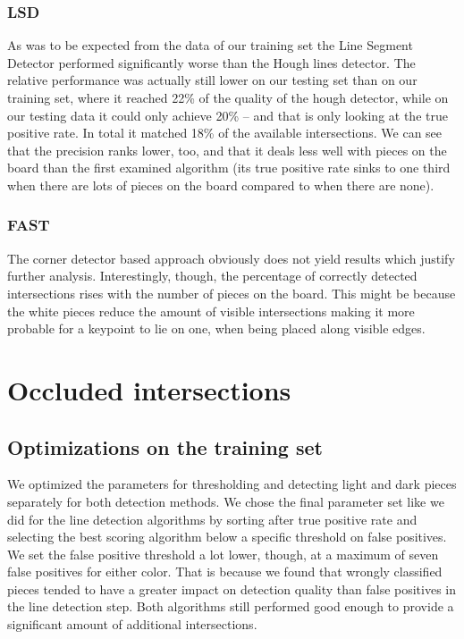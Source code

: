 	\subsubsection{LSD}
	As was to be expected from the data of our training set the Line Segment Detector performed significantly worse than the Hough lines detector. The relative performance was actually still lower on our testing set than on our training set, where it reached 22\% of the quality of the hough detector, while on our testing data it could only achieve 20\% -- and that is only looking at the true positive rate. In total it matched 18\% of the available intersections. We can see that the precision ranks lower, too, and that it deals less well with pieces on the board than the first examined algorithm (its true positive rate sinks to one third when there are lots of pieces on the board compared to when there are none).

	\subsubsection{FAST}
	The corner detector based approach obviously does not yield results which justify further analysis. Interestingly, though, the percentage of correctly detected intersections rises with the number of pieces on the board. This might be because the white pieces reduce the amount of visible intersections making it more probable for a keypoint to lie on one, when being placed along visible edges.

	
	\clearpage





	\section{Occluded intersections}
	\subsection{Optimizations on the training set}
	We optimized the parameters for thresholding and detecting light and dark pieces separately for both detection methods. We chose the final parameter set like we did for the line detection algorithms by sorting after true positive rate and selecting the best scoring algorithm below a specific threshold on false positives. We set the false positive threshold a lot lower, though, at a maximum of seven false positives for either color. That is because we found that wrongly classified pieces tended to have a greater impact on detection quality than false positives in the line detection step. Both algorithms still performed good enough to provide a significant amount of additional intersections.

